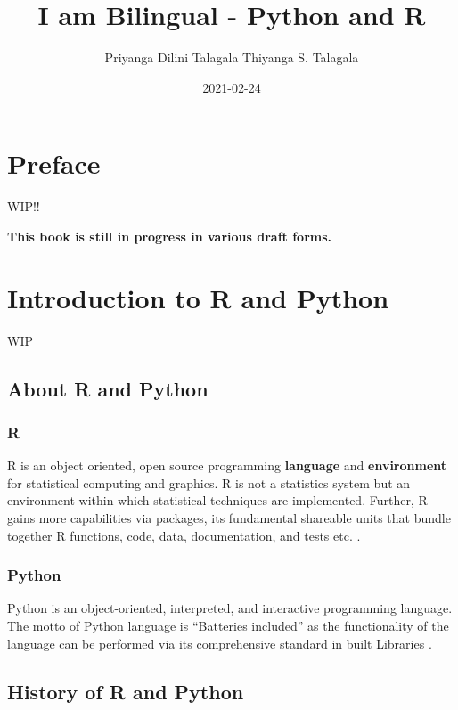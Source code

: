 \documentclass[]{book}
\title{I am Bilingual - Python and R}
\author{Priyanga Dilini Talagala Thiyanga S. Talagala}
\date{2021-02-24}
\begin{document}
\maketitle

{
\setcounter{tocdepth}{1}
\tableofcontents
}
\hypertarget{preface}{%
\chapter*{Preface}\label{preface}}

WIP!!

\textbf{This book is still in progress in various draft forms.}

\hypertarget{intro}{%
\chapter{Introduction to R and Python}\label{intro}}

WIP

\hypertarget{about-r-and-python}{%
\section{About R and Python}\label{about-r-and-python}}

\hypertarget{r}{%
\subsection{R}\label{r}}

R is an object oriented, open source programming \textbf{language} and \textbf{environment} for statistical computing and graphics. R is not a statistics system but an environment within which statistical techniques are implemented. Further, R gains more capabilities via packages, its fundamental shareable units that bundle together R functions, code, data, documentation, and tests etc. \citep{Rcoreteam2020}.

\hypertarget{python}{%
\subsection{Python}\label{python}}

Python is an object-oriented, interpreted, and interactive programming language. The motto of Python language is ``Batteries included'' as the functionality of the language can be performed via its comprehensive standard in built Libraries \citep{wikipython}.

\hypertarget{history-of-r-and-python}{%
\section{History of R and Python}\label{history-of-r-and-python}}
\end{document}
